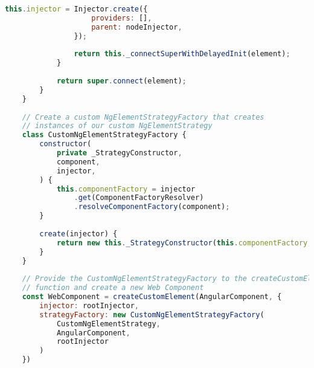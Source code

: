 \begin{lstlisting}[language={JavaScript},caption={The code for creating a Hierarchical Injector in an Angular Elements component},label={lst:appendix:hierarchical-injectors}]
				this.injector = Injector.create({
					providers: [],
					parent: nodeInjector,
				});
	
				return this._connectSuperWithDelayedInit(element);
			}
	
			return super.connect(element);
		}
	}
	
	// Create a custom NgElementStrategyFactory that creates
	// instances of our custom NgElementStrategy
	class CustomNgElementStrategyFactory {
		constructor(
			private _StrategyConstructor,
			component,
			injector,
		) {
			this.componentFactory = injector
				.get(ComponentFactoryResolver)
				.resolveComponentFactory(component);
		}
	
		create(injector) {
			return new this._StrategyConstructor(this.componentFactory, injector);
		}
	}
	
	// Provide the CustomNgElementStrategyFactory to the createCustomElement
	// function and create a new Web Component
	const WebComponent = createCustomElement(AngularComponent, {
		injector: rootInjector,
		strategyFactory: new CustomNgElementStrategyFactory(
			CustomNgElementStrategy,
			AngularComponent,
			rootInjector
		)
	})
		\end{lstlisting}